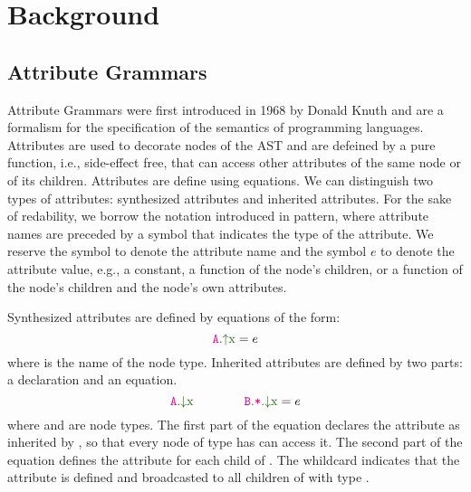 \section{Background}
\label{chap:attr-grammars}
\subsection{Attribute Grammars}
Attribute Grammars were first introduced in 1968 by Donald Knuth and are a formalism for the specification
of the semantics of programming languages. Attributes are used to decorate nodes of the AST
and are defeined by a pure function, i.e., side-effect free, that can access other attributes of the same node or of its children.
Attributes are define using equations. We can distinguish two types of attributes: synthesized attributes and inherited attributes.
For the sake of redability, we borrow the notation introduced in pattern, 
where attribute names are preceded by a symbol that indicates the type of the attribute.
We reserve the symbol  to denote the attribute name and the symbol $e$ to denote the attribute value,
e.g., a constant, a function of the node's children, or a function of the node's children 
and the node's own attributes. 

Synthesized attributes are defined by equations of the form:
\begin{equation*}
\Asyn{A}{x} = e
\end{equation*}
where  is the name of the node type.
Inherited attributes are defined by two parts: a declaration and an equation.
\begin{equation*}
\Ainh{A}{x} \quad\quad \quad\quad \Ainhdef{B}{*}{x} = e
\end{equation*}
where  and  are node types. 
The first part of the equation declares the attribute  as inherited by ,
so that every node of type  has can access it. The second part of the 
equation defines the attribute for each child of . The whildcard \astnode{*}
indicates that the attribute is defined and broadcasted to all children of  with type .


